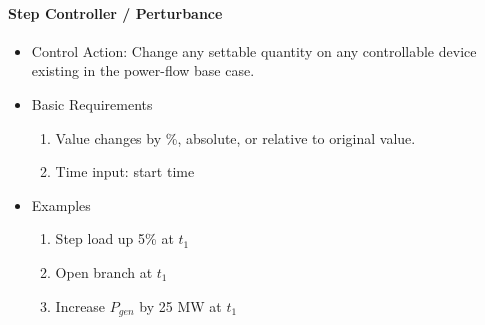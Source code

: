 \documentclass[12pt]{article}
\newcommand{\q}{(\textit{\textbf{?}})}
\begin{document}
\begin{multicols*}{2}
\raggedright
\noindent
\paragraph{Step Controller / Perturbance}
\begin{itemize}
	\item Control Action: Change any settable quantity on any controllable device existing in the power-flow base case.
	\item Basic Requirements
	\begin{enumerate}
		\item Value changes by \%, absolute, or relative to original value.
		\item Time input: start time
	\end{enumerate}
	\item Examples
	\begin{enumerate}
		\item Step load up 5\% at $t_1$
		\item Open branch at $t_1$
		\item Increase $P_{gen}$ by 25 MW at $t_1$
	\end{enumerate}
\end{itemize}


\end{multicols*}
\end{document}
